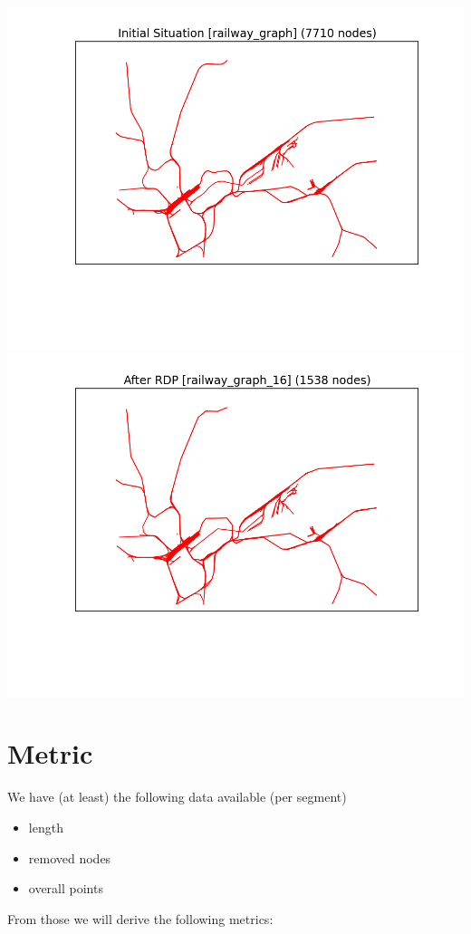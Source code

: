 \documentclass[twoside]{scrartcl}
\begin{document}
\includegraphics[scale=0.49]{rdprg-1.png}
\includegraphics[scale=0.49]{rdprg-2.png}

\section{Metric}
We have (at least) the following data available (per segment)

\begin{itemize}
\item length
\item removed nodes
\item overall points
\end{itemize}

From those we will derive the following metrics:
\end{document}
